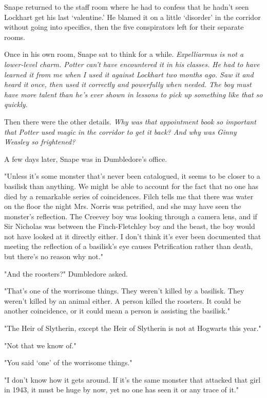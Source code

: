 \documentclass[a4paper,11pt]{article}
\begin{document}
Snape returned to the staff room where he had to confess that he hadn't seen Lockhart get his last `valentine.' He blamed it on a little `disorder' in the corridor without going into specifics, then the five conspirators left for their separate rooms.

Once in his own room, Snape sat to think for a while. \emph{Expelliarmus is not a lower-level charm. Potter can't have encountered it in his classes. He had to have learned it from me when I used it against Lockhart two months ago. Saw it and heard it once, then used it correctly and powerfully when needed. The boy must have more talent than he's ever shown in lessons to pick up something like that so quickly.}

Then there were the other details. \emph{Why was that appointment book so important that Potter used magic in the corridor to get it back? And why was Ginny Weasley so frightened?}

A few days later, Snape was in Dumbledore's office.

"Unless it's some monster that's never been catalogued, it seems to be closer to a basilisk than anything. We might be able to account for the fact that no one has died by a remarkable series of coincidences. Filch tells me that there was water on the floor the night Mrs. Norris was petrified, and she may have seen the monster's reflection. The Creevey boy was looking through a camera lens, and if Sir Nicholas was between the Finch-Fletchley boy and the beast, the boy would not have looked at it directly either. I don't think it's ever been documented that meeting the reflection of a basilisk's eye causes Petrification rather than death, but there's no reason why not."

"And the roosters?" Dumbledore asked.

"That's one of the worrisome things. They weren't killed by a basilisk. They weren't killed by an animal either. A person killed the roosters. It could be another coincidence, or it could mean a person is assisting the basilisk."

"The Heir of Slytherin, except the Heir of Slytherin is not at Hogwarts this year."

"Not that we know of."

"You said `one' of the worrisome things."

"I don't know how it gets around. If it's the same monster that attacked that girl in 1943, it must be huge by now, yet no one has seen it or any trace of it."
\end{document}
